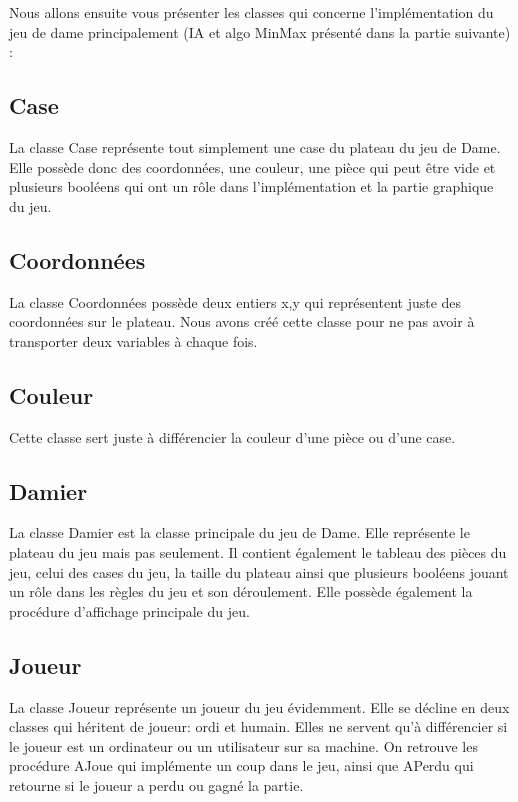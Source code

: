 \documentclass[12,french]{report}
\begin{document}
Nous allons ensuite vous  présenter les classes qui concerne l'implémentation du jeu de dame principalement (IA et algo MinMax présenté dans la partie suivante) :
\subsection{Case}

La classe Case représente tout simplement une case du plateau du jeu de Dame. Elle possède donc des coordonnées, une couleur, une pièce qui peut être vide et plusieurs booléens qui ont un rôle dans l'implémentation et la partie graphique du jeu.
  
\subsection{Coordonnées}

La classe Coordonnées possède deux entiers x,y qui représentent juste des coordonnées sur le plateau. Nous avons créé cette classe pour ne pas avoir à transporter deux variables à chaque fois.

\subsection{Couleur}

Cette classe sert juste à différencier la couleur d'une pièce ou d'une case.

\subsection{Damier}

La classe Damier est la classe principale du jeu de Dame. Elle représente le plateau du jeu mais pas seulement. Il contient également le tableau des pièces du jeu, celui des cases du jeu, la taille du plateau ainsi que plusieurs booléens jouant un rôle dans les règles du jeu et son déroulement. Elle possède également la procédure d'affichage principale du jeu.

\subsection{Joueur}

La classe Joueur représente un joueur du jeu évidemment. Elle se décline en deux classes qui héritent de joueur: ordi et humain. Elles ne servent qu'à différencier si le joueur est un ordinateur ou un utilisateur sur sa machine. On retrouve les procédure AJoue qui implémente un coup dans le jeu, ainsi que APerdu qui retourne si le joueur a perdu ou gagné la partie.
\end{document}
